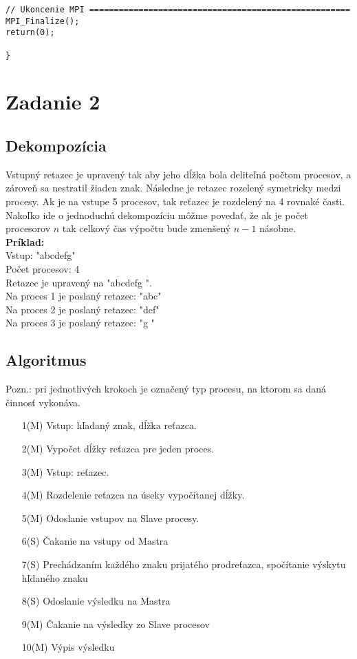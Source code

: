 \documentclass{report}
\begin{document}
\begin{lstlisting}
// Ukoncenie MPI =====================================================
MPI_Finalize();
return(0);

}
\end{lstlisting}


\chapter{Zadanie 2}
\section{Dekompozícia}
Vstupný retazec je upravený tak aby jeho dĺžka bola deliteľná počtom procesov, a zároveň sa nestratil žiaden znak.
Následne je retazec rozelený symetricky medzi procesy.
Ak je na vstupe 5 procesov, tak reťazec je rozdelený na 4 rovnaké časti. 
Nakoľko ide o jednoduchú dekompozíciu môžme povedať, že ak je počet procesorov \(n\) tak celkový čas výpočtu bude zmenšený \(n-1\) násobne.\\

\textbf{Príklad:} \\
Vstup: "abcdefg" \\
Počet procesov: 4 \\
Retazec je upravený na "abcdefg  ". \\
Na proces 1 je poslaný retazec: "abc" \\
Na proces 2 je poslaný retazec: "def" \\
Na proces 3 je poslaný retazec: "g  " \\

\section{Algoritmus}
Pozn.: pri jednotlivých krokoch je označený typ procesu, na ktorom sa daná činnosť vykonáva.\\
\begin{enumerate}
\item[1(M)] Vstup: hľadaný znak, dĺžka reťazca.
\item[2(M)] Vypočet dĺžky reťazca pre jeden proces.
\item[3(M)] Vstup: reťazec.
\item[4(M)] Rozdelenie reťazca na úseky vypočítanej dĺžky.
\item[5(M)] Odoslanie vstupov na Slave procesy.
\item[6(S)] Čakanie na vstupy od Mastra
\item[7(S)] Prechádzaním každého znaku prijatého prodreťazca, spočítanie výskytu hľdaného znaku
\item[8(S)] Odoslanie výsledku na Mastra
\item[9(M)] Čakanie na výsledky zo Slave procesov
\item[10(M)] Výpis výsledku
\end{enumerate}
\end{document}
